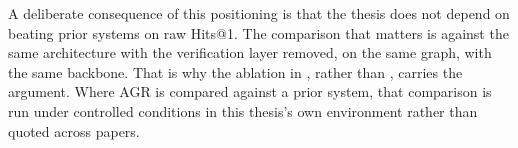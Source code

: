 A deliberate consequence of this positioning is that the thesis does not depend
on beating prior systems on raw Hits@1. The comparison that matters is against
the same architecture with the verification layer removed, on the same graph,
with the same backbone. That is why the ablation in ,
rather than , carries the argument. Where AGR is compared
against a prior system, that comparison is run under controlled conditions in
this thesis's own environment rather than quoted across papers.

\endinput
